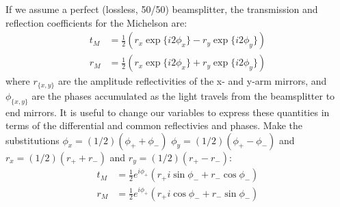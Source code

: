 If we assume a perfect (lossless, 50/50) beamsplitter, the
transmission and reflection coefficients for the Michelson are:
%
\begin{align}
t_M  &= \frac{1}{2}\left(r_x \exp \{i2\phi_x\} - r_y \exp\{i2\phi_y\} \right) \\
r_M  &= \frac{1}{2}\left(r_x \exp \{i2\phi_x\} + r_y \exp\{i2\phi_y\} \right)
\end{align}
where $r_{\{x,y\}}$ are the amplitude reflectivities of the x- and y-arm mirrors, and $\phi_{\{x,y\}}$ are 
the phases accumulated as the light travels from the beamsplitter to end mirrors.  It is useful to change
our variables to express these quantities in terms of the differential and common reflectivies and phases.
Make the substitutions
$\phi_x = (1/2)\left(\phi_+ + \phi_-\right)$
$\phi_y = (1/2)\left(\phi_+ - \phi_-\right)$
and $r_x = (1/2)(r_+ + r_-)$ and $r_y = (1/2)(r_+ - r_-)$:
%
\begin{align}
t_M  &= \frac{1}{2} e^{i\phi_+} \left( r_+ i \sin \phi_- + r_- \cos \phi_- \right)\\
r_M  &= \frac{1}{2} e^{i\phi_+} \left( r_+ i \cos \phi_- + r_- \sin \phi_- \right) 
\end{align}

